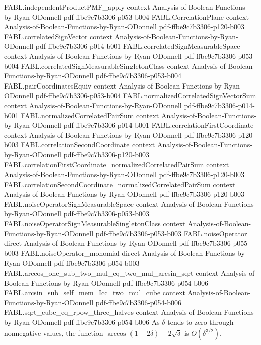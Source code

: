 \begin{theorem}
\proofstep
  {FABL.independentProductPMF_apply}
  {context}
  {Analysis-of-Boolean-Functions-by-Ryan-ODonnell}
  {pdf-ffbe9c7b3306-p053-b004}
\proofstep
  {FABL.CorrelationPlane}
  {context}
  {Analysis-of-Boolean-Functions-by-Ryan-ODonnell}
  {pdf-ffbe9c7b3306-p120-b003}
\proofstep
  {FABL.correlatedSignVector}
  {context}
  {Analysis-of-Boolean-Functions-by-Ryan-ODonnell}
  {pdf-ffbe9c7b3306-p014-b001}
\proofstep
  {FABL.correlatedSignMeasurableSpace}
  {context}
  {Analysis-of-Boolean-Functions-by-Ryan-ODonnell}
  {pdf-ffbe9c7b3306-p053-b004}
\proofstep
  {FABL.correlatedSignMeasurableSingletonClass}
  {context}
  {Analysis-of-Boolean-Functions-by-Ryan-ODonnell}
  {pdf-ffbe9c7b3306-p053-b004}
\proofstep
  {FABL.pairCoordinatesEquiv}
  {context}
  {Analysis-of-Boolean-Functions-by-Ryan-ODonnell}
  {pdf-ffbe9c7b3306-p053-b004}
\proofstep
  {FABL.normalizedCorrelatedSignVectorSum}
  {context}
  {Analysis-of-Boolean-Functions-by-Ryan-ODonnell}
  {pdf-ffbe9c7b3306-p014-b001}
\proofstep
  {FABL.normalizedCorrelatedPairSum}
  {context}
  {Analysis-of-Boolean-Functions-by-Ryan-ODonnell}
  {pdf-ffbe9c7b3306-p014-b001}
\proofstep
  {FABL.correlationFirstCoordinate}
  {context}
  {Analysis-of-Boolean-Functions-by-Ryan-ODonnell}
  {pdf-ffbe9c7b3306-p120-b003}
\proofstep
  {FABL.correlationSecondCoordinate}
  {context}
  {Analysis-of-Boolean-Functions-by-Ryan-ODonnell}
  {pdf-ffbe9c7b3306-p120-b003}
\proofstep
  {FABL.correlationFirstCoordinate_normalizedCorrelatedPairSum}
  {context}
  {Analysis-of-Boolean-Functions-by-Ryan-ODonnell}
  {pdf-ffbe9c7b3306-p120-b003}
\proofstep
  {FABL.correlationSecondCoordinate_normalizedCorrelatedPairSum}
  {context}
  {Analysis-of-Boolean-Functions-by-Ryan-ODonnell}
  {pdf-ffbe9c7b3306-p120-b003}
\proofstep
  {FABL.noiseOperatorSignMeasurableSpace}
  {context}
  {Analysis-of-Boolean-Functions-by-Ryan-ODonnell}
  {pdf-ffbe9c7b3306-p053-b003}
\proofstep
  {FABL.noiseOperatorSignMeasurableSingletonClass}
  {context}
  {Analysis-of-Boolean-Functions-by-Ryan-ODonnell}
  {pdf-ffbe9c7b3306-p053-b003}
\proofstep
  {FABL.noiseOperator}
  {direct}
  {Analysis-of-Boolean-Functions-by-Ryan-ODonnell}
  {pdf-ffbe9c7b3306-p055-b003}
\proofstep
  {FABL.noiseOperator_monomial}
  {direct}
  {Analysis-of-Boolean-Functions-by-Ryan-ODonnell}
  {pdf-ffbe9c7b3306-p054-b003}
\proofstep
  {FABL.arccos_one_sub_two_mul_eq_two_mul_arcsin_sqrt}
  {context}
  {Analysis-of-Boolean-Functions-by-Ryan-ODonnell}
  {pdf-ffbe9c7b3306-p054-b006}
\proofstep
  {FABL.arcsin_sub_self_mem_Icc_two_mul_cube}
  {context}
  {Analysis-of-Boolean-Functions-by-Ryan-ODonnell}
  {pdf-ffbe9c7b3306-p054-b006}
\proofstep
  {FABL.sqrt_cube_eq_rpow_three_halves}
  {context}
  {Analysis-of-Boolean-Functions-by-Ryan-ODonnell}
  {pdf-ffbe9c7b3306-p054-b006}
As $\delta$ tends to zero through nonnegative values, the function
$\arccos(1-2\delta)-2\sqrt{\delta}$ is $O(\delta^{3/2})$.
\end{theorem}

